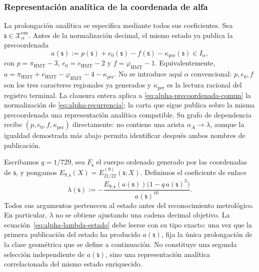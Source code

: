 \subsubsection{Representación analítica de la coordenada de alfa}
\label{subsec:alpha-lector-completo-rev08}

La prolongación analítica se especifica mediante todos sus coeficientes.
Sea \(\mathsf s\in\mathcal X_\alpha^{\mathrm{enr}}\). Antes
de la normalización decimal, el mismo estado ya publica la precoordenada
\begin{equation}
 a(\mathsf s):=p(\mathsf s)+e_0(\mathsf s)-f(\mathsf s)
                 -\kappa_{\mathrm{per}}(\mathsf s)\in I_\alpha,
 \label{eq:alpha-precoordenada-comun}
\end{equation}
con \(p=\pi_{\mathrm{HMT}}-3\),
\(e_0=e_{\mathrm{HMT}}-2\) y
\(f=\varphi_{\mathrm{HMT}}-1\). Equivalentemente,
\(a=\pi_{\mathrm{HMT}}+e_{\mathrm{HMT}}-
\varphi_{\mathrm{HMT}}-4-\kappa_{\mathrm{per}}\). No se introduce aquí
\(\alpha\) convencional: \(p,e_0,f\) son los tres caracteres regionales ya
generados y \(\kappa_{\mathrm{per}}\) es la lectura racional del registro
terminal. La clausura entera aplica a
\eqref{eq:alpha-precoordenada-comun} la normalización de
\eqref{eq:alpha-recurrencia}; la carta que sigue publica sobre la misma
precoordenada una representación analítica compatible. Su grafo de
dependencia recibe \((p,e_0,f,\kappa_{\mathrm{per}})\) directamente: no
contiene una arista \(\alpha_A\to\lambda\), aunque la igualdad demostrada más
abajo permita identificar después ambos nombres de publicación.

Escribamos \(q=1/729\), sea \(F_{\mathsf s}\) el cuerpo ordenado generado por
las coordenadas de \(\mathsf s\), y pongamos
\(E_{9,\mathsf s}(X)=E_{21/22}^{(9)}(\mathsf s;X)\). Definimos el coeficiente
de enlace
\begin{equation}
 \lambda(\mathsf s):=
 -\frac{E_{9,\mathsf s}(a(\mathsf s))
         \bigl(1-q\,a(\mathsf s)^3\bigr)}{a(\mathsf s)^{10}}.
 \label{eq:alpha-lambda-estado}
\end{equation}
Todos sus argumentos pertenecen al estado antes del reconocimiento
metrológico. En particular, \(\lambda\) no se obtiene ajustando una cadena
decimal objetivo. La ecuación~\eqref{eq:alpha-lambda-estado} debe leerse con
su tipo exacto: una vez que la primera publicación del estado ha producido
\(a(\mathsf s)\), fija la única prolongación de la clase geométrica que se
define a continuación. No constituye una segunda selección independiente de
\(a(\mathsf s)\), sino una representación analítica correlacionada del mismo
estado enriquecido.

